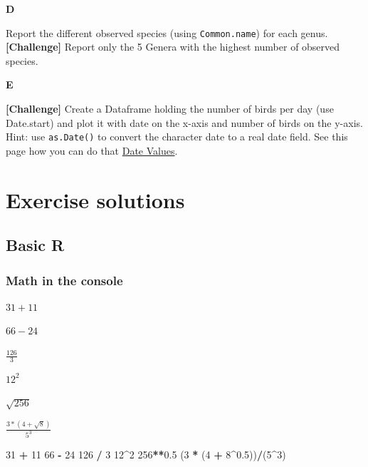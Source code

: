 \documentclass[]{book}
\newenvironment{Shaded}{\begin{snugshade}}{\end{snugshade}}
\newcommand{\DecValTok}[1]{\textcolor[rgb]{0.00,0.00,0.81}{#1}}
\newcommand{\FloatTok}[1]{\textcolor[rgb]{0.00,0.00,0.81}{#1}}
\newcommand{\NormalTok}[1]{#1}
\newcommand{\OperatorTok}[1]{\textcolor[rgb]{0.81,0.36,0.00}{\textbf{#1}}}
\newcommand{\StringTok}[1]{\textcolor[rgb]{0.31,0.60,0.02}{#1}}
\begin{document}
\textbf{D}

Report the different observed species (using \texttt{Common.name}) for each genus. \textbf{{[}Challenge{]}} Report only the 5 Genera with the highest number of observed species.

\textbf{E}

\textbf{{[}Challenge{]}} Create a Dataframe holding the number of birds per day (use Date.start) and plot it with date on the x-axis and number of birds on the y-axis. Hint: use \texttt{as.Date()} to convert the character date to a real date field. See this page how you can do that \href{http://www.statmethods.net/input/dates.html}{Date Values}.

\hypertarget{exercise-solutions}{%
\chapter{Exercise solutions}\label{exercise-solutions}}

\hypertarget{basic-r-1}{%
\section{Basic R}\label{basic-r-1}}

\hypertarget{math-in-the-console-1}{%
\subsection{Math in the console}\label{math-in-the-console-1}}

\(31 + 11\)

\(66 - 24\)

\(\frac{126}{3}\)

\(12^2\)

\(\sqrt{256}\)

\(\frac{3*(4+\sqrt{8})}{5^3}\)

\begin{Shaded}
\begin{Highlighting}[]
\DecValTok{31} \OperatorTok{+}\StringTok{ }\DecValTok{11}
\DecValTok{66} \OperatorTok{-}\StringTok{ }\DecValTok{24}
\DecValTok{126} \OperatorTok{/}\StringTok{ }\DecValTok{3}
\DecValTok{12}\OperatorTok{^}\DecValTok{2} 
\DecValTok{256}\OperatorTok{**}\FloatTok{0.5}
\NormalTok{(}\DecValTok{3} \OperatorTok{*}\StringTok{ }\NormalTok{(}\DecValTok{4} \OperatorTok{+}\StringTok{ }\DecValTok{8}\OperatorTok{^}\FloatTok{0.5}\NormalTok{))}\OperatorTok{/}\NormalTok{(}\DecValTok{5}\OperatorTok{^}\DecValTok{3}\NormalTok{)}
\end{Highlighting}
\end{Shaded}
\end{document}
